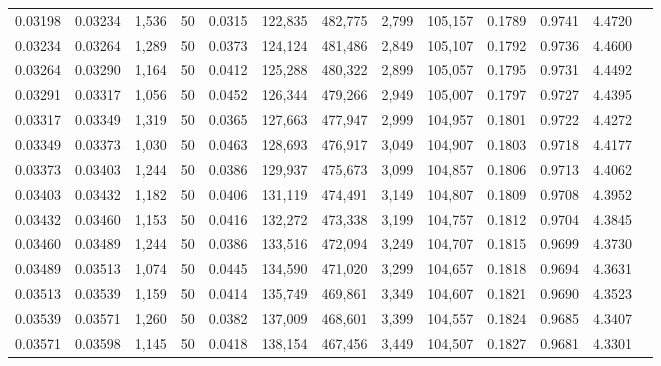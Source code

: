 \begin{tabular}{rrrrrrrrrrrrr}
0.03198 & 0.03234 & 1,536 &  50 &                                     0.0315 & 122,835 & 482,775 &   2,799 & 105,157 & 0.1789 & 0.9741 & 4.4720 \\
0.03234 & 0.03264 & 1,289 &  50 &                                     0.0373 & 124,124 & 481,486 &   2,849 & 105,107 & 0.1792 & 0.9736 & 4.4600 \\
0.03264 & 0.03290 & 1,164 &  50 &                                     0.0412 & 125,288 & 480,322 &   2,899 & 105,057 & 0.1795 & 0.9731 & 4.4492 \\
0.03291 & 0.03317 & 1,056 &  50 &                                     0.0452 & 126,344 & 479,266 &   2,949 & 105,007 & 0.1797 & 0.9727 & 4.4395 \\
0.03317 & 0.03349 & 1,319 &  50 &                                     0.0365 & 127,663 & 477,947 &   2,999 & 104,957 & 0.1801 & 0.9722 & 4.4272 \\
0.03349 & 0.03373 & 1,030 &  50 &                                     0.0463 & 128,693 & 476,917 &   3,049 & 104,907 & 0.1803 & 0.9718 & 4.4177 \\
0.03373 & 0.03403 & 1,244 &  50 &                                     0.0386 & 129,937 & 475,673 &   3,099 & 104,857 & 0.1806 & 0.9713 & 4.4062 \\
0.03403 & 0.03432 & 1,182 &  50 &                                     0.0406 & 131,119 & 474,491 &   3,149 & 104,807 & 0.1809 & 0.9708 & 4.3952 \\
0.03432 & 0.03460 & 1,153 &  50 &                                     0.0416 & 132,272 & 473,338 &   3,199 & 104,757 & 0.1812 & 0.9704 & 4.3845 \\
0.03460 & 0.03489 & 1,244 &  50 &                                     0.0386 & 133,516 & 472,094 &   3,249 & 104,707 & 0.1815 & 0.9699 & 4.3730 \\
0.03489 & 0.03513 & 1,074 &  50 &                                     0.0445 & 134,590 & 471,020 &   3,299 & 104,657 & 0.1818 & 0.9694 & 4.3631 \\
0.03513 & 0.03539 & 1,159 &  50 &                                     0.0414 & 135,749 & 469,861 &   3,349 & 104,607 & 0.1821 & 0.9690 & 4.3523 \\
0.03539 & 0.03571 & 1,260 &  50 &                                     0.0382 & 137,009 & 468,601 &   3,399 & 104,557 & 0.1824 & 0.9685 & 4.3407 \\
0.03571 & 0.03598 & 1,145 &  50 &                                     0.0418 & 138,154 & 467,456 &   3,449 & 104,507 & 0.1827 & 0.9681 & 4.3301 \\

\end{tabular}
